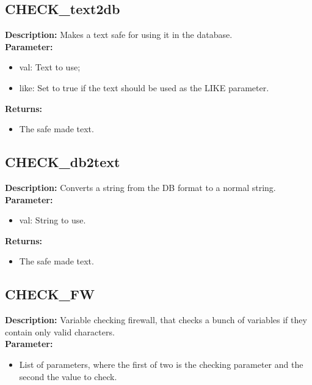 \subsection{CHECK\_text2db}
\textbf{Description:} Makes a text safe for using it in the database.\\
\textbf{Parameter:}
\begin{itemize}
\item val: Text to use;
\item like: Set to true if the text should be used as the LIKE parameter.
\end{itemize}
\textbf{Returns:}
\begin{itemize}
\item The safe made text.
\end{itemize}

\subsection{CHECK\_db2text}
\textbf{Description:} Converts a string from the DB format to a normal string.\\
\textbf{Parameter:}
\begin{itemize}
\item val: String to use.
\end{itemize}
\textbf{Returns:}
\begin{itemize}
\item The safe made text.
\end{itemize}

\subsection{CHECK\_FW}
\textbf{Description:} Variable checking firewall, that checks a bunch of variables if they contain only valid characters.\\
\textbf{Parameter:}
\begin{itemize}
\item List of parameters, where the first of two is the checking parameter and the second the value to check.
\end{itemize}

